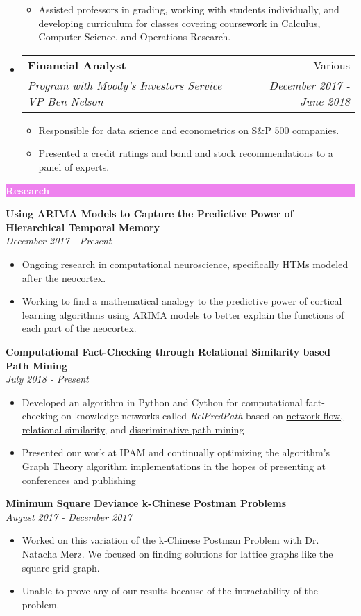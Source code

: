 \documentclass[letterpaper,11pt]{article}
\makeatletter
\newcommand{\resitem}[1]{\item #1 \vspace{-2pt}}
\newcommand{\resheading}[1]{{\large \colorbox{violet}{\begin{minipage}{\textwidth}{\textbf{#1 \vphantom{p\^{E}}}}\end{minipage}}}}
\newcommand{\ressubheading}[4]{
	\begin{tabular*}{7.0in}{l@{\extracolsep{\fill}}r}
		\textbf{#1} & #2 \\
		\textit{#3} & \textit{#4} \\
	\end{tabular*}\vspace{-6pt}}
\makeatother
\begin{document}
\begin{itemize}
\begin{itemize}
			\resitem{Assisted professors in grading, working with students individually, and developing curriculum for classes covering coursework in Calculus, Computer Science, and Operations Research.}
		\end{itemize}
		\item
		\ressubheading{Financial Analyst}{Various}{Program with Moody’s Investors Service VP Ben Nelson}{December 2017 - June 2018}
		\begin{itemize}
			\resitem{Responsible for data science and econometrics on S\&P 500 companies.}
			\resitem{Presented a credit ratings and bond and stock recommendations to a panel of experts.}
		\end{itemize}
		
	\end{itemize}
	
	\resheading{\textcolor{white}{Research}}
	
		\vspace{0.1in}
		
		\textbf{Using ARIMA Models to Capture the Predictive Power of Hierarchical Temporal Memory} \\ \textit{December 2017 - Present}
		\begin{itemize}[topsep=3pt, itemsep=1pt]
			\resitem{\href{https://github.com/alexandermichels/HonorsResearch}{Ongoing research} in computational neuroscience, specifically HTMs modeled after the neocortex.}
			\resitem{Working to find a mathematical analogy to the predictive power of cortical learning algorithms using ARIMA models to better explain the functions of each part of the neocortex.}
		\end{itemize}
		
		\textbf{Computational Fact-Checking through Relational Similarity based Path Mining} \\	\textit{July 2018 - Present}
		\begin{itemize}[topsep=3pt, itemsep=1pt]
			\resitem{Developed an algorithm in Python and Cython for computational fact-checking on knowledge networks called \textit{RelPredPath} based on \href{https://arxiv.org/pdf/1708.07239.pdf}{network flow, relational similarity,} and \href{https://arxiv.org/pdf/1510.05911.pdf}{discriminative path mining} }
			\resitem{Presented our work at IPAM and continually optimizing the algorithm's Graph Theory algorithm implementations in the hopes of presenting at conferences and publishing}
		\end{itemize}
		
		\textbf{Minimum Square Deviance k-Chinese Postman Problems} \\ \textit{August 2017 - December 2017}
		\begin{itemize}[topsep=3pt, itemsep=1pt]
			\resitem{Worked on this variation of the k-Chinese Postman Problem with Dr. Natacha Merz. We focused on finding solutions for lattice graphs like the square grid graph.}
			\resitem{Unable to prove any of our results because of the intractability of the problem.}
		\end{itemize}
\end{document}
